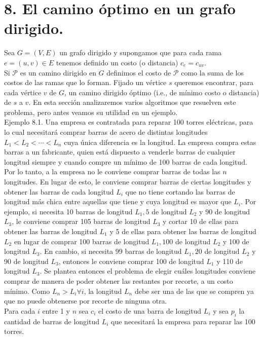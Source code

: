 \documentclass[10pt]{article}
\begin{document}
\section*{8. El camino óptimo en un grafo dirigido.}
Sea $G=(V, E)$ un grafo dirigido y supongamos que para cada rama $e=(u, v) \in E$ tenemos definido un costo (o distancia) $c_{e}=c_{u v}$.\\
Si $\mathcal{P}$ es un camino dirigido en $G$ definimos el costo de $\mathcal{P}$ como la suma de los costos de las ramas que lo forman. Fijado un vértice $s$ queremos encontrar, para cada vértice $v$ de $G$, un camino dirigido óptimo (i.e., de mínimo costo o distancia) de $s$ a $v$. En esta sección analizaremos varios algoritmos que resuelven este problema, pero antes veamos su utilidad en un ejemplo.\\
Ejemplo 8.1. Una empresa es contratada para reparar 100 torres eléctricas, para lo cual necesitará comprar barras de acero de distintas longitudes $L_{1}<L_{2}<\cdots<L_{n}$ cuya única diferencia es la longitud. La empresa compra estas barras a un fabricante, quien está dispuesto a venderle barras de cualquier longitud siempre y cuando compre un mínimo de 100 barras de cada longitud. Por lo tanto, a la empresa no le conviene comprar barras de todas las $n$ longitudes. En lugar de esto, le conviene comprar barras de ciertas longitudes y obtener las barras de cada longitud $L_{i}$ que no tiene cortando las barras de longitud más chica entre aquellas que tiene y cuya longitud es mayor que $L_{i}$. Por ejemplo, si necesita 10 barras de longitud $L_{1}, 5$ de longitud $L_{2}$ y 90 de longitud $L_{3}$, le conviene comprar 105 barras de longitud $L_{3}$ y cortar 10 de ellas para obtener las barras de longitud $L_{1}$ y 5 de ellas para obtener las barras de longitud $L_{2}$ en lugar de comprar 100 barras de longitud $L_{1}, 100$ de longitud $L_{2}$ y 100 de longitud $L_{3}$. En cambio, si necesita 99 barras de longitud $L_{1}, 20$ de longitud $L_{2}$ y 90 de longitud $L_{3}$, entonces le conviene comprar 100 de longitud $L_{1}$ y 110 de longitud $L_{3}$. Se plantea entonces el problema de elegir cuáles longitudes conviene comprar de manera de poder obtener las restantes por recorte, a un costo mínimo. Como $L_{n}>L_{i} \forall i$, la longitud $L_{n}$ debe ser una de las que se compren ya que no puede obtenerse por recorte de ninguna otra.\\
Para cada $i$ entre 1 y $n$ sea $c_{i}$ el costo de una barra de longitud $L_{i}$ y sea $p_{i}$ la cantidad de barras de longitud $L_{i}$ que necesitará la empresa para reparar las 100 torres.
\end{document}
